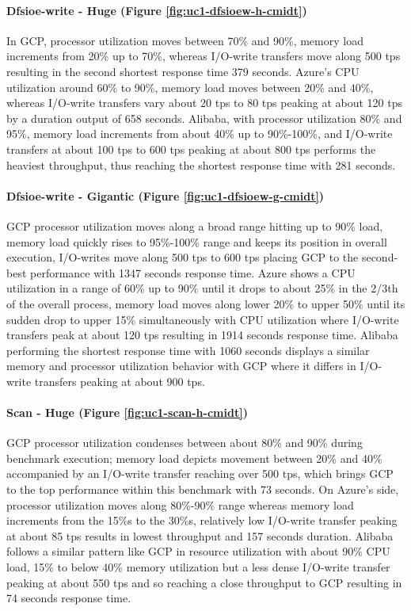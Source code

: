 \documentclass[review]{elsarticle}
\begin{document}
\paragraph{Dfsioe-write - Huge (Figure \ref{fig:uc1-dfsioew-h-cmidt})}In GCP, processor utilization moves between 70\% and 90\%, memory load increments from 20\% up to 70\%, whereas I/O-write transfers move along 500 tps resulting in the second shortest response time 379 seconds. Azure's CPU utilization around 60\% to 90\%, memory load moves between 20\% and 40\%, whereas I/O-write transfers vary about 20 tps to 80 tps peaking at about 120 tps by a duration output of 658 seconds. Alibaba, with processor utilization 80\% and 95\%, memory load increments from about 40\% up to 90\%-100\%, and I/O-write transfers at about 100 tps to 600 tps peaking at about 800 tps performs the heaviest throughput, thus reaching the shortest response time with 281 seconds.

\paragraph{Dfsioe-write - Gigantic (Figure \ref{fig:uc1-dfsioew-g-cmidt})}GCP processor utilization moves along a broad range hitting up to 90\% load, memory load quickly rises to 95\%-100\% range and keeps its position in overall execution, I/O-writes move along 500 tps to 600 tps placing GCP to the second-best performance with 1347 seconds response time. Azure shows a CPU utilization in a range of 60\% up to 90\% until it drops to about 25\% in the 2/3th of the overall process, memory load moves along lower 20\% to upper 50\% until its sudden drop to upper 15\% simultaneously with CPU utilization where I/O-write transfers peak at about 120 tps resulting in 1914 seconds response time. Alibaba performing the shortest response time with 1060 seconds displays a similar memory and processor utilization behavior with GCP where it differs in I/O-write transfers peaking at about 900 tps.

\paragraph{Scan - Huge (Figure \ref{fig:uc1-scan-h-cmidt})}GCP processor utilization condenses between about 80\% and 90\% during benchmark execution; memory load depicts movement between 20\% and 40\% accompanied by an I/O-write transfer reaching over 500 tps, which brings GCP to the top performance within this benchmark with 73 seconds. On Azure's side, processor utilization moves along 80\%-90\% range whereas memory load increments from the 15\%s to the 30\%s, relatively low I/O-write transfer peaking at about 85 tps results in lowest throughput and 157 seconds duration. Alibaba follows a similar pattern like GCP in resource utilization with about 90\% CPU load, 15\% to below 40\% memory utilization but a less dense I/O-write transfer peaking at about 550 tps and so reaching a close throughput to GCP resulting in 74 seconds response time.
\end{document}
